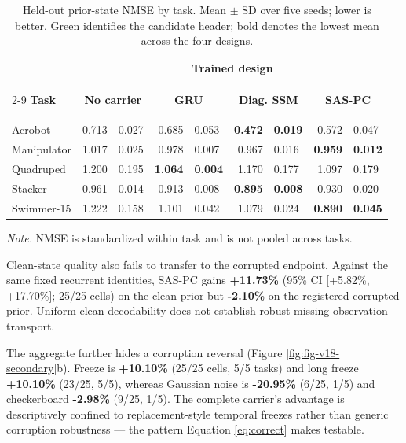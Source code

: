 \begin{table}[!t]
\centering
\caption{Held-out prior-state NMSE by task. Mean \(\pm\) SD over five seeds; lower is better. Green identifies the candidate header; bold denotes the lowest mean across the four designs.}
\label{tbl:task-nmse}
\small
\setlength{\tabcolsep}{4.2pt}
\begin{tabular}{@{}l r@{\,\(\pm\)\,}l r@{\,\(\pm\)\,}l r@{\,\(\pm\)\,}l r@{\,\(\pm\)\,}l@{}}
\toprule
& \multicolumn{8}{c}{\textcolor{NVIDIADark}{\textbf{Trained design}}} \\
\cmidrule(lr){2-9}
\textbf{Task} & \multicolumn{2}{c}{\textbf{No carrier}} & \multicolumn{2}{c}{\textbf{GRU}} & \multicolumn{2}{c}{\textbf{Diag. SSM}} & \multicolumn{2}{c}{\colorbox{NVIDIAPale}{\strut\textcolor{NVIDIADark}{\textbf{SAS-PC}}}} \\
\midrule
Acrobot & 0.713 & 0.027 & 0.685 & 0.053 & \bfseries 0.472 & \bfseries 0.019 & 0.572 & 0.047 \\
Manipulator & 1.017 & 0.025 & 0.978 & 0.007 & 0.967 & 0.016 & \bfseries 0.959 & \bfseries 0.012 \\
Quadruped & 1.200 & 0.195 & \bfseries 1.064 & \bfseries 0.004 & 1.170 & 0.177 & 1.097 & 0.179 \\
Stacker & 0.961 & 0.014 & 0.913 & 0.008 & \bfseries 0.895 & \bfseries 0.008 & 0.930 & 0.020 \\
Swimmer-15 & 1.222 & 0.158 & 1.101 & 0.042 & 1.079 & 0.024 & \bfseries 0.890 & \bfseries 0.045 \\
\bottomrule
\end{tabular}
\vspace{1pt}
\begin{minipage}{0.98\linewidth}\footnotesize\textit{Note.} NMSE is standardized within task and is not pooled across tasks.\end{minipage}
\end{table}

Clean-state quality also fails to transfer to the corrupted endpoint.
Against the same fixed recurrent identities, SAS-PC gains
\textbf{+11.73\%} (95\% CI {[}+5.82\%, +17.70\%{]}; 25/25 cells) on the
clean prior but \textbf{-2.10\%} on the registered corrupted prior.
Uniform clean decodability does not establish robust missing-observation
transport.

The aggregate further hides a corruption reversal (Figure
\ref{fig:fig-v18-secondary}b). Freeze is \textbf{+10.10\%} (25/25 cells,
5/5 tasks) and long freeze \textbf{+10.10\%} (23/25, 5/5), whereas
Gaussian noise is \textbf{-20.95\%} (6/25, 1/5) and checkerboard
\textbf{-2.98\%} (9/25, 1/5). The complete carrier's advantage is
descriptively confined to replacement-style temporal freezes rather than
generic corruption robustness --- the pattern Equation \ref{eq:correct}
makes testable.

